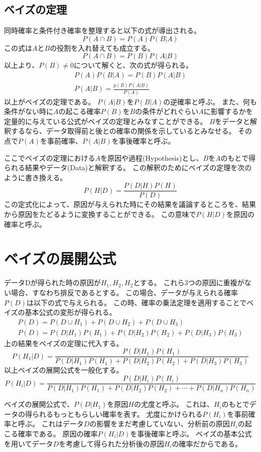 \documentclass{ltjsarticle}
\begin{document}
\subsection{ベイズの定理}
同時確率と条件付き確率を整理すると以下の式が導出される。
\begin{equation}
    P(A \cap B)=P(A) P(B|A)
\end{equation}
この式は$A$と$B$の役割を入れ替えても成立する。
\begin{equation}
    P(A \cap B)=P(B) P(A|B)
\end{equation}
以上より、$P(B)\not=0$について解くと、次の式が得られる。
\begin{eqnarray}
    P(A) P(B|A) = P(B) P(A|B) \\
    P(A|B) = \frac{p(B)P(A|B)}{P(A)}
\end{eqnarray}
以上がベイズの定理である。
$P(A|B)$を$P(B|A)$の逆確率と呼ぶ。
また、何も条件がない時に$A$の起こる確率$P(B)$を$B$の条件がどれぐらい$A$に影響するかを定量的に与えている公式がベイズの定理とみなすことができる。
$B$をデータと解釈するなら、データ取得前と後との確率の関係を示しているとみなせる。
その点で$P(A)$を事前確率、$P(A|B)$を事後確率と呼ぶ。

ここでベイズの定理における$A$を原因や過程(Hypothesis)とし、$B$を$A$のもとで得られる結果やデータ(Data)と解釈する。
この解釈のためにベイズの定理を次のように書き換える。
\begin{equation}
    P(H|D)=\frac{P(D|H)P(H)}{P(D)}
\end{equation}
この定式化によって、原因が与えられた時にその結果を議論するところを、結果から原因をたどるように変換することができる。
この意味で$P(H|D)$を原因の確率と呼ぶ。

\section{ベイズの展開公式}
データDが得られた時の原因が$H_1, H_2, H_2$とする。
これら3つの原因に重複がない場合、すなわち排反であるとする。
この場合、データが与えられる確率$P(D)$は以下の式で与えられる。
この時、確率の乗法定理を適用することでベイズの基本公式の変形が得られる。
\begin{eqnarray}
    P(D)=P(D \cup H_1) + P(D \cup H_2) + P(D \cup H_3) \\
    P(D)=P(D|H_1) P(H_1) + P(D|H_2) P(H_2) + P(D|H_3) P(H_3)
\end{eqnarray}
上の結果をベイズの定理に代入する。
\begin{equation}
    P(H_1|D) = \frac{P(D|H_1)P(H_1)}{P(D|H_1) P(H_1) + P(D|H_2) P(H_2) + P(D|H_3) P(H_3)}
\end{equation}
以上ベイズの展開公式を一般化する。
\begin{equation}
    P(H_i|D) = \frac{P(D|H_i)P(H_i)}{P(D|H_1) P(H_1) + P(D|H_2) P(H_2) + \cdots + P(D|H_n) P(H_n)}
\end{equation}

ベイズの展開公式で、$P(D|H_1)$を原因$H$の尤度と呼ぶ。
これは、$H_i$のもとでデータの得られるもっともらしい確率を表す。
尤度にかけられる$P(H_i)$を事前確率と呼ぶ。
これはデータ$D$の影響をまだ考慮していない、分析前の原因$H_i$の起こる確率である。
原因の確率$P(H_i|D)$を事後確率と呼ぶ。
ベイズの基本公式を用いてデータ$D$を考慮して得られた分析後の原因$H_i$の確率だからである。
\end{document}
